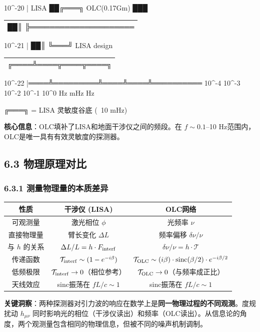 \documentclass[12pt,a4paper]{article}
\begin{document}
10^-20  |    LISA   ██╔═══╗       OLC(0.17Gm) ███
\begin{tabular}{|c|}
\hline
██║   ╠═════════════════════ \\
\hline
\hline
\end{tabular}

10^-21  |          ██║   ╚═══╝ LISA design
\begin{tabular}{|c|}
\hline
╔════╩════╦════╦════╗ \\
\hline
\hline
\end{tabular}

10^-22  |════╩═════════╩════╩════╩══════════
10^-4   10^-3   10^-2  10^-1   10^0   Hz
mHz               Hz

╔═══╗ = LISA 灵敏度谷底 (~10 mHz)

\textbf{核心信息}：OLC填补了LISA和地面干涉仪之间的频段。在 $f \sim 0.1$–10 Hz范围内，OLC是唯一具有有效灵敏度的探测器。

\subsection{6.3 物理原理对比}


\subsubsection{6.3.1 测量物理量的本质差异}


\begin{tabular}{|c|c|c|}
\hline
性质 & 干涉仪 (LISA) & OLC网络 \\
\hline
可观测量 & 激光相位 $\phi$ & 光频率 $\nu$ \\
直接物理量 & 臂长变化 $\Delta L$ & 频率偏移 $\delta\nu/\nu$ \\
与 $h$ 的关系 & $\Delta L/L = h \cdot F_{\rm interf}$ & $\delta\nu/\nu = h \cdot \mathcal{T}$ \\
传递函数 & $\mathcal{T}_{\rm interf} \sim (1 - e^{-i\beta})$ & $\mathcal{T}_{\rm OLC} \sim (i\beta) \cdot {\rm sinc}(\beta/2) \cdot e^{-i\beta/2}$ \\
低频极限 & $\mathcal{T}_{\rm interf} \to 0$（相位参考） & $\mathcal{T}_{\rm OLC} \to 0$（与频率成正比） \\
天线效应 & sinc振荡在 $fL/c \sim 1$ & sinc振荡在 $fL/c \sim 1$ \\
\hline
\end{tabular}


\textbf{关键洞察}：两种探测器对引力波的响应在数学上是\textbf{同一物理过程的不同观测}。度规扰动 $h_{\mu\nu}$ 同时影响光的相位（干涉仪读出）和频率（OLC读出）。从信息论的角度，两个观测量包含相同的物理信息，但被不同的噪声机制调制。
\end{document}
